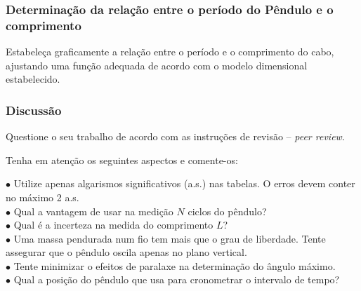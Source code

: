 \documentclass[a4paper,12pt]{article}      %
\begin{document}
\subsubsection*{\sf Determinação da relação entre o período do Pêndulo e o comprimento }
Estabeleça graficamente a relação entre o período e o comprimento do cabo, ajustando uma função adequada  de acordo com o modelo dimensional estabelecido. 

\subsubsection*{\sf Discussão }
 
Questione o seu trabalho de acordo com as instruções de revisão – \emph{peer review}.


Tenha em atenção os seguintes aspectos e comente-os:
 \begin{flushleft}
	 $\bullet$ Utilize apenas algarismos significativos (a.s.) nas tabelas. O erros devem conter no máximo 2 a.s. \\
	 $\bullet$ Qual a vantagem de usar na medição $N$ ciclos do pêndulo? \\
	 $\bullet$  Qual é a incerteza na medida do comprimento $L$? \\	
	 $\bullet$ Uma massa pendurada num fio tem mais que o grau de liberdade. Tente assegurar que o pêndulo oscila apenas no plano vertical. \\
	 $\bullet$ Tente minimizar o efeitos de paralaxe na determinação do ângulo máximo.  \\
	 $\bullet$ Qual a posição do pêndulo que usa para cronometrar o intervalo de tempo?  \\
\end{flushleft} 

%


\end{document}
